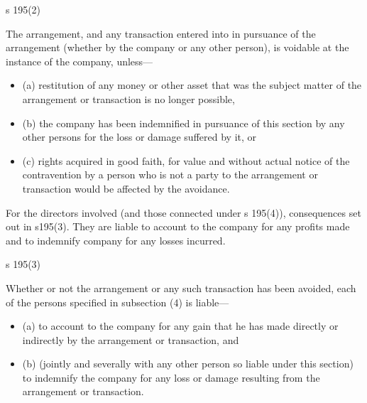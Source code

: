 \documentclass[
]{article}
\providecommand{\tightlist}{%
  \setlength{\itemsep}{0pt}\setlength{\parskip}{0pt}}
\newenvironment{env-136e818f-6bd8-45c9-b7d8-e6b8925f9e62}
{
    \savenotes\tcolorbox[blanker,breakable,left=5pt,borderline west={2pt}{-4pt}{green}]
}
{
    \endtcolorbox\spewnotes
}
\begin{document}
\begin{env-136e818f-6bd8-45c9-b7d8-e6b8925f9e62}

s 195(2)

The arrangement, and any transaction entered into in pursuance of the
arrangement (whether by the company or any other person), is voidable at
the instance of the company, unless---

\begin{itemize}
\tightlist
\item
  (a) restitution of any money or other asset that was the subject
  matter of the arrangement or transaction is no longer possible,
\item
  (b) the company has been indemnified in pursuance of this section by
  any other persons for the loss or damage suffered by it, or
\item
  (c) rights acquired in good faith, for value and without actual notice
  of the contravention by a person who is not a party to the arrangement
  or transaction would be affected by the avoidance.
\end{itemize}

\end{env-136e818f-6bd8-45c9-b7d8-e6b8925f9e62}

For the directors involved (and those connected under s 195(4)),
consequences set out in s195(3). They are liable to account to the
company for any profits made and to indemnify company for any losses
incurred.

\begin{env-136e818f-6bd8-45c9-b7d8-e6b8925f9e62}

s 195(3)

Whether or not the arrangement or any such transaction has been avoided,
each of the persons specified in subsection (4) is liable---

\begin{itemize}
\tightlist
\item
  (a) to account to the company for any gain that he has made directly
  or indirectly by the arrangement or transaction, and
\item
  (b) (jointly and severally with any other person so liable under this
  section) to indemnify the company for any loss or damage resulting
  from the arrangement or transaction.
\end{itemize}

\end{env-136e818f-6bd8-45c9-b7d8-e6b8925f9e62}
\end{document}
